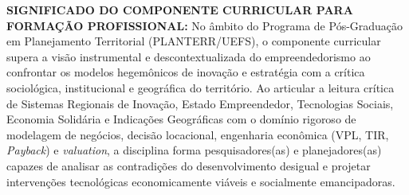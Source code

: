 \documentclass[11pt,a4paper]{article}
\begin{document}
\normalsize
\vspace{8pt}
\noindent\textbf{SIGNIFICADO DO COMPONENTE CURRICULAR PARA FORMAÇÃO PROFISSIONAL:} No âmbito do Programa de Pós-Graduação em Planejamento Territorial (PLANTERR/UEFS), o componente curricular supera a visão instrumental e descontextualizada do empreendedorismo ao confrontar os modelos hegemônicos de inovação e estratégia com a crítica sociológica, institucional e geográfica do território. Ao articular a leitura crítica de Sistemas Regionais de Inovação, Estado Empreendedor, Tecnologias Sociais, Economia Solidária e Indicações Geográficas com o domínio rigoroso de modelagem de negócios, decisão locacional, engenharia econômica (VPL, TIR, \textit{Payback}) e \textit{valuation}, a disciplina forma pesquisadores(as) e planejadores(as) capazes de analisar as contradições do desenvolvimento desigual e projetar intervenções tecnológicas economicamente viáveis e socialmente emancipadoras.
\end{document}
